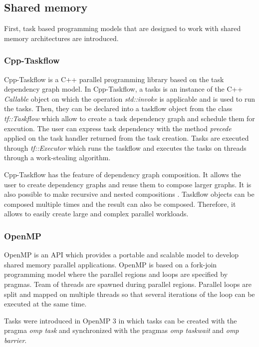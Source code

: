 \subsection{Shared memory}
First, task based programming models that are designed to work with shared memory architectures are introduced.

\subsubsection{Cpp-Taskflow}
Cpp-Taskflow \cite{LiHGW2019a} \cite{HuLGW2019} is a C++ parallel programming library based on the task dependency graph model.
In Cpp-Taskflow, a tasks is an instance of the C++ \textit{Callable} object on which the operation \textit{std::invoke} is applicable and is used to run the tasks.
Then, they can be declared into a taskflow object from the class \textit{tf::Taskflow} which allow to create a task dependency graph and schedule them for execution.
The user can express task dependency with the method \textit{precede} applied on the task handler returned from the task creation.
Tasks are executed through \textit{tf::Executor} which runs the taskflow and executes the tasks on threads through a work-stealing algorithm.

Cpp-Taskflow has the feature of dependency graph composition.
It allows the user to create dependency graphs and reuse them to compose larger graphs.
It is also possible to make recursive and nested compositions \cite{LiHGW2019b}.
Taskflow objects can be composed multiple times and the result can also be composed.
Therefore, it allows to easily create large and complex parallel workloads.

\subsubsection{OpenMP}
OpenMP \cite{DaguM1998} is an API which provides a portable and scalable model to develop shared memory parallel applications.
OpenMP is based on a fork-join programming model where the parallel regions and loops are specified by pragmas.
Team of threads are spawned during parallel regions.
Parallel loops are split and mapped on multiple threads so that several iterations of the loop can be executed at the same time.

Tasks were introduced in OpenMP 3 \cite{ACDHM2009} in which tasks can be created with the pragma \textit{omp task} and synchronized with the pragmas \textit{omp taskwait} and \textit{omp barrier}.

